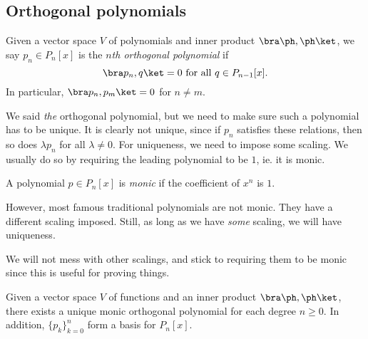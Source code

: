 \documentclass[a4paper]{article}
\begin{document}
\subsection{Orthogonal polynomials}
\begin{defi}
  Given a vector space $V$ of polynomials and inner product $\bra \ph, \ph\ket$, we say $p_n \in P_n[x]$ is the \emph{$n$th orthogonal polynomial} if
  \[
    \bra p_n, q\ket = 0\text{ for all }q \in P_{n - 1}[x].
  \]
  In particular, $\bra p_n, p_m\ket = 0$ for $n \not= m$.
\end{defi}

We said \emph{the} orthogonal polynomial, but we need to make sure such a polynomial has to be unique. It is clearly not unique, since if $p_n$ satisfies these relations, then so does $\lambda p_n$ for all $\lambda \not= 0$. For uniqueness, we need to impose some scaling. We usually do so by requiring the leading polynomial to be $1$, ie. it is monic.

\begin{defi}
  A polynomial $p \in P_n[x]$ is \emph{monic} if the coefficient of $x^n$ is $1$.
\end{defi}
However, most famous traditional polynomials are not monic. They have a different scaling imposed. Still, as long as we have \emph{some} scaling, we will have uniqueness.

We will not mess with other scalings, and stick to requiring them to be monic since this is useful for proving things.

\begin{thm}
  Given a vector space $V$ of functions and an inner product $\bra \ph, \ph \ket$, there exists a unique monic orthogonal polynomial for each degree $n \geq 0$. In addition, $\{p_k\}_{k = 0}^n$ form a basis for $P_n[x]$.
\end{thm}
\end{document}
